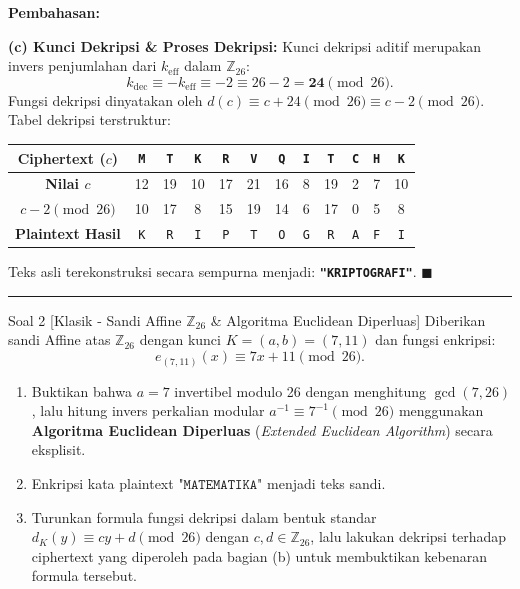 \documentclass[11pt,a4paper]{article}
\newenvironment{solusi}{\noindent\textbf{\textsf{Pembahasan:}}\par\vspace{0.2em}}{\hfill$\blacksquare$\vspace{1em}\par\hrule\vspace{1em}}
\begin{document}
\begin{solusi}
\vspace{0.2cm}
\textbf{(c) Kunci Dekripsi \& Proses Dekripsi:}
Kunci dekripsi aditif merupakan invers penjumlahan dari $k_{\text{eff}}$ dalam $\mathbb{Z}_{26}$:
\[
k_{\text{dec}} \equiv -k_{\text{eff}} \equiv -2 \equiv 26 - 2 = \mathbf{24} \pmod{26}.
\]
Fungsi dekripsi dinyatakan oleh $d(c) \equiv c + 24 \pmod{26} \equiv c - 2 \pmod{26}$.
Tabel dekripsi terstruktur:
\begin{center}
\begin{tabular}{c c c c c c c c c c c c}
\toprule
\textbf{Ciphertext ($c$)} & \texttt{M} & \texttt{T} & \texttt{K} & \texttt{R} & \texttt{V} & \texttt{Q} & \texttt{I} & \texttt{T} & \texttt{C} & \texttt{H} & \texttt{K} \\
\midrule
\textbf{Nilai $c$} & 12 & 19 & 10 & 17 & 21 & 16 & 8 & 19 & 2 & 7 & 10 \\
\textbf{$c - 2 \pmod{26}$} & 10 & 17 & 8 & 15 & 19 & 14 & 6 & 17 & 0 & 5 & 8 \\
\textbf{Plaintext Hasil} & \texttt{K} & \texttt{R} & \texttt{I} & \texttt{P} & \texttt{T} & \texttt{O} & \texttt{G} & \texttt{R} & \texttt{A} & \texttt{F} & \texttt{I} \\
\bottomrule
\end{tabular}
\end{center}
Teks asli terekonstruksi secara sempurna menjadi: \textbf{\texttt{"KRIPTOGRAFI"}}.
\end{solusi}


\begin{soalklasik}{Soal 2 [Klasik - Sandi Affine $\mathbb{Z}_{26}$ \& Algoritma Euclidean Diperluas]}
Diberikan sandi Affine atas $\mathbb{Z}_{26}$ dengan kunci $K = (a, b) = (7, 11)$ dan fungsi enkripsi:
\[
e_{(7, 11)}(x) \equiv 7x + 11 \pmod{26}.
\]
\begin{enumerate}[label=(\alph*)]
    \item Buktikan bahwa $a = 7$ invertibel modulo 26 dengan menghitung $\gcd(7, 26)$, lalu hitung invers perkalian modular $a^{-1} \equiv 7^{-1} \pmod{26}$ menggunakan \textbf{Algoritma Euclidean Diperluas} (\textit{Extended Euclidean Algorithm}) secara eksplisit.
    \item Enkripsi kata plaintext $\texttt{"MATEMATIKA"}$ menjadi teks sandi.
    \item Turunkan formula fungsi dekripsi dalam bentuk standar $d_K(y) \equiv c y + d \pmod{26}$ dengan $c, d \in \mathbb{Z}_{26}$, lalu lakukan dekripsi terhadap ciphertext yang diperoleh pada bagian (b) untuk membuktikan kebenaran formula tersebut.
\end{enumerate}
\end{soalklasik}
\end{document}
